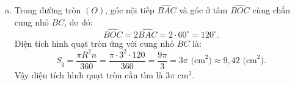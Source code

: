 \begin{bt}
{\begin{enumerate}[a)]
\begin{itemize}
		\item $\widehat{AMH} = \widehat{AHB} = 90^\circ$.
	\end{itemize}
	Do đó $\triangle AHM \sim \triangle ABH$ (g-g).
	Suy ra $\dfrac{AH}{AB} = \dfrac{AM}{AH} \implies AM \cdot AB = AH^2$.
	Chứng minh tương tự, xét $\triangle AHN$ và $\triangle ACH$ có:
	\begin{itemize}
		\item $\widehat{CAH}$ là góc chung;
		\item $\widehat{ANH} = \widehat{AHC} = 90^\circ$.
	\end{itemize}
	Do đó $\triangle AHN \sim \triangle ACH$ (g-g).
	Suy ra $\dfrac{AH}{AC} = \dfrac{AN}{AH} \implies AN \cdot AC = AH^2$.
	Từ đó suy ra $AM \cdot AB = AN \cdot AC = AH^2$.
	\item Trong đường tròn $(O)$, góc nội tiếp $\widehat{BAC}$ và góc ở tâm $\widehat{BOC}$ cùng chắn cung nhỏ $BC$, do đó:
	$$\widehat{BOC} = 2\widehat{BAC} = 2 \cdot 60^\circ = 120^\circ.$$
	Diện tích hình quạt tròn ứng với cung nhỏ $BC$ là:
	$$S_q = \dfrac{\pi R^2 n}{360} = \dfrac{\pi \cdot 3^2 \cdot 120}{360} = \dfrac{9\pi}{3} = 3\pi\text{ (cm}^2\text{)} \approx 9{,}42\text{ (cm}^2\text{)}.$$
	Vậy diện tích hình quạt tròn cần tìm là $3\pi\text{ cm}^2$.
\end{enumerate}
}
\end{bt}


